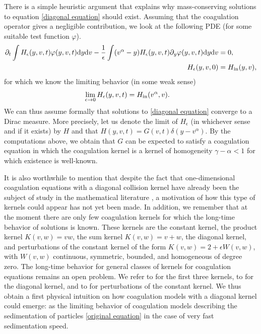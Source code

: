 \documentclass[11pt]{article}
\numberwithin{equation}{section}
\newcommand{\der}{\textup{d}}
\begin{document}
There is a simple heuristic argument that explains why mass-conserving solutions to equation \eqref{diagonal equation} should exist. Assuming that the coagulation operator gives a negligible contribution, we look at the following PDE (for some suitable test function $\varphi$).
\begin{align*}
\partial_{t}\int H_{\epsilon}(y,v,t)\varphi(y,v,t)\der y \der v-\frac{1}{\epsilon}\int (v^{\alpha}-y)H_{\epsilon}(y,v,t)\partial_{y}\varphi(y,v,t)\der y \der v&=0,\\
H_{\epsilon}(y,v,0)&=H_{\textup{in}}(y,v),
\end{align*}
for which we know the limiting behavior (in some weak sense)
\begin{align}\label{behavior is dirac}
\lim_{\epsilon\rightarrow 0}H_{\epsilon}(y,v,t)&=H_{\textup{in}}(v^{\alpha},v).
\end{align}
We can thus assume formally that solutions to \eqref{diagonal equation} converge to a Dirac measure. More precisely, let us denote the limit of $H_{\epsilon}$ (in whichever sense and if it exists) by $H$ and that $H(y,v,t)=G(v,t)\delta(y-v^{\alpha})$. By the computations above, we obtain that $G$ can be expected to satisfy a coagulation equation in which the coagulation kernel is a  kernel of homogeneity $\gamma-\alpha<1$ for which existence is well-known.



It is also worthwhile to mention that despite the fact that one-dimensional coagulation equations with a diagonal collision kernel have already been the subject of study in the mathematical literature \cite{diagonal, diagonal2, leyvraz,bonacini1,bonacinipeak1,bonacinipeak2}, a motivation of how this type of kernels could appear has not yet been made. In addition, we remember that at the moment there are only few coagulation kernels for which the long-time behavior of solutions is known. These kernels are the constant kernel, the product kernel $K(v,w)=vw$, the sum kernel $K(v,w)=v+w$, the diagonal kernel, and perturbations of the constant kernel of the form $K(v,w)=2+\epsilon W(v,w)$, with $W(v,w)$ continuous, symmetric, bounded, and homogeneous of degree zero. The long-time behavior for general classes of kernels for coagulation equations remains an open problem. We refer to \cite{menonpego} for the first three kernels, to \cite{leyvraz, diagonal, diagonal2} for the diagonal kernel, and to \cite{thromcanizo, throm1} for perturbations of the constant kernel. We thus obtain a first physical intuition on how coagulation models with a diagonal kernel could emerge: as the limiting behavior of  coagulation models describing the sedimentation of particles \eqref{original equation} in the case of very fast sedimentation speed. 
\end{document}

